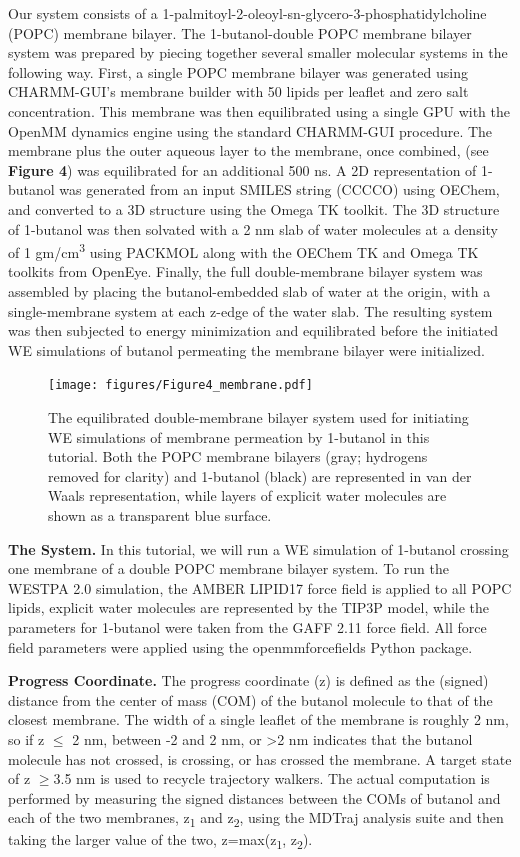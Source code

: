 Our system consists of a 1-palmitoyl-2-oleoyl-sn-glycero-3-phosphatidylcholine (POPC) membrane bilayer. 
The 1-butanol-double POPC membrane bilayer system was prepared by piecing together several smaller molecular systems in the following way.
First, a single POPC membrane bilayer was generated using CHARMM-GUI’s membrane builder with 50 lipids per leaflet and zero salt concentration. 
This membrane was then equilibrated using a single GPU with the OpenMM dynamics engine using the standard CHARMM-GUI procedure. 
The membrane plus the outer aqueous layer to the membrane, once combined, (see \textbf{Figure 4}) was equilibrated for an additional 500 ns.
A 2D representation of 1-butanol was generated from an input SMILES string (CCCCO) using OEChem, and converted to a 3D structure using the Omega TK toolkit. 
The 3D structure of 1-butanol was then solvated with a 2 nm slab of water molecules at a density of 1 gm/cm\textsuperscript{3} using PACKMOL along with the OEChem TK and Omega TK toolkits from OpenEye.
Finally, the full double-membrane bilayer system was assembled by placing the butanol-embedded slab of water at the origin, with a single-membrane system at each z-edge of the water slab. 
The resulting system was then subjected to energy minimization and equilibrated before the initiated WE simulations of butanol permeating the membrane bilayer were initialized. 

\begin{figure}[t]
\centering
\texttt{[image: figures/Figure4\_membrane.pdf]}
\caption{The equilibrated double-membrane bilayer system used for initiating WE simulations of membrane permeation by 1-butanol in this tutorial. 
Both the POPC membrane bilayers (gray; hydrogens removed for clarity) and 1-butanol (black) are represented in van der Waals representation, while layers of explicit water molecules are shown as a transparent blue surface.}
\end{figure}

\textbf{The System.} In this tutorial, we will run a WE simulation of 1-butanol crossing one membrane of a double POPC membrane bilayer system. 
To run the WESTPA 2.0 simulation, the AMBER LIPID17 force field is applied to all POPC lipids, explicit water molecules are represented by the TIP3P model, while the parameters for 1-butanol were taken from the GAFF 2.11 force field. 
All force field parameters were applied using the openmmforcefields Python package.

\textbf{Progress Coordinate.} The progress coordinate (z) is defined as the (signed) distance from the center of mass (COM) of the butanol molecule to that of the closest membrane. 
The width of a single leaflet of the membrane is roughly 2 nm, so if z $\leq$ 2 nm, between -2 and 2 nm, or >2 nm indicates that the butanol molecule has not crossed, is crossing, or has crossed the membrane. 
A target state of z $\geq$3.5 nm is used to recycle trajectory walkers. 
The actual computation is performed by measuring the signed distances between the COMs of butanol and each of the two membranes, z\textsubscript{1} and z\textsubscript{2}, using the MDTraj analysis suite and then taking the larger value of the two, z=max(z\textsubscript{1}, z\textsubscript{2}).

